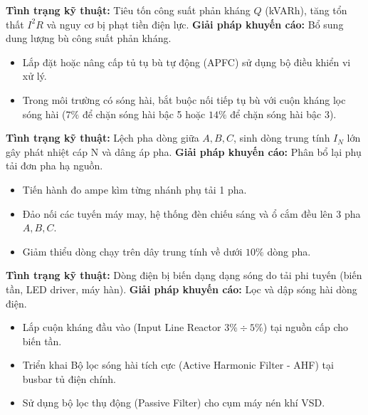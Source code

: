 \documentclass[12pt,a4paper]{article}
\begin{document}
\begin{description}[style=nextline,leftmargin=1.5em,labelindent=0pt,itemsep=0.8em]
  \item[\color{primary}\textbf{1. Hệ số công suất thấp ($\cos\phi < \text{Ngưỡng}$)}]
  \textbf{Tình trạng kỹ thuật:} Tiêu tốn công suất phản kháng $Q$ (kVARh), tăng tổn thất $I^2 R$ và nguy cơ bị phạt tiền điện lực.
  \textbf{Giải pháp khuyến cáo:} Bổ sung dung lượng bù công suất phản kháng.
  \begin{itemize}
    \item Lắp đặt hoặc nâng cấp tủ tụ bù tự động (APFC) sử dụng bộ điều khiển vi xử lý.
    \item Trong môi trường có sóng hài, bắt buộc nối tiếp tụ bù với cuộn kháng lọc sóng hài ($7\%$ để chặn sóng hài bậc 5 hoặc $14\%$ để chặn sóng hài bậc 3).
  \end{itemize}

  \item[\color{primary}\textbf{2. Mất cân bằng dòng điện ($\Delta I > \text{Ngưỡng}$)}]
  \textbf{Tình trạng kỹ thuật:} Lệch pha dòng giữa $A, B, C$, sinh dòng trung tính $I_N$ lớn gây phát nhiệt cáp N và dâng áp pha.
  \textbf{Giải pháp khuyến cáo:} Phân bổ lại phụ tải đơn pha hạ nguồn.
  \begin{itemize}
    \item Tiến hành đo ampe kìm từng nhánh phụ tải 1 pha.
    \item Đảo nối các tuyến máy may, hệ thống đèn chiếu sáng và ổ cắm đều lên 3 pha $A, B, C$.
    \item Giảm thiểu dòng chạy trên dây trung tính về dưới $10\%$ dòng pha.
  \end{itemize}

  \item[\color{primary}\textbf{3. Sóng hài dòng điện cao ($TDD_I > \text{Ngưỡng}$)}]
  \textbf{Tình trạng kỹ thuật:} Dòng điện bị biến dạng dạng sóng do tải phi tuyến (biến tần, LED driver, máy hàn).
  \textbf{Giải pháp khuyến cáo:} Lọc và dập sóng hài dòng điện.
  \begin{itemize}
    \item Lắp cuộn kháng đầu vào (Input Line Reactor $3\% \div 5\%$) tại nguồn cấp cho biến tần.
    \item Triển khai Bộ lọc sóng hài tích cực (Active Harmonic Filter - AHF) tại busbar tủ điện chính.
    \item Sử dụng bộ lọc thụ động (Passive Filter) cho cụm máy nén khí VSD.
  \end{itemize}


\end{description}
\end{document}

